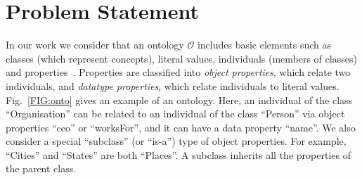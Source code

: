 \documentclass[letterpaper]{article} %
\newcommand{\forijcai}[1]{}
\begin{document}
\forijcai{
Section \ref{SEC:problem} formally states the problem. 
In Section \ref{SEC:ML} we present how we convert learnt data into a 
useful data representation. 
Section \ref{SEC:STP} shows how we model the problem as a STP, 
whereas Section \ref{SEC:CP} presents our implementation in CP. 
Section \ref{SEC:Res} shows the results. 
Section \ref{SEC:pw} compares with the previous work done to achieve this task. 
}

\section{Problem Statement \label{SEC:problem}}


In our work we consider that an ontology $\mathcal{O}$ includes basic elements such 
as classes (which represent concepts), literal values, individuals (members of classes) and properties~\cite{Spanos:semweb}.
Properties are classified into \emph{object properties}, which relate two 
individuals, 
and \emph{datatype properties}, which relate individuals to literal values.
Fig.~\ref{FIG:onto} gives an example of an ontology. 
Here, an individual of the class ``Organisation'' can be related to an individual of the class ``Person'' via object properties ``ceo'' or ``worksFor'', and it can have a data property ``name''. 
We also consider a special ``subclass'' (or ``is-a'') type of object properties.
For 
example, ``Cities'' and ``States'' are both ``Places''. 
A subclass inherits all the properties of the parent class.
\end{document}
